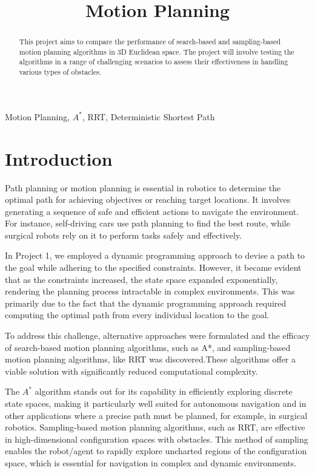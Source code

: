 \documentclass[journal]{IEEEtran} %
\begin{document}
\title{Motion Planning\\
}

\author{%
}

\maketitle

\begin{abstract}
    This project aims to compare the performance of search-based and sampling-based motion planning algorithms in 3D Euclidean space. The project will
     involve testing the algorithms in a range of challenging scenarios to assess their effectiveness in handling various types of obstacles.
    
\end{abstract}

\begin{IEEEkeywords}
   Motion Planning, $A^{\ast}$, RRT, Deterministic Shortest Path
\end{IEEEkeywords}
\section{Introduction}
Path planning or motion planning is essential in robotics to determine the optimal path for achieving objectives or reaching target locations. 
It involves generating a sequence of safe and efficient actions to navigate the environment. For instance, self-driving cars use 
path planning to find the best route, while surgical robots rely on it to perform tasks safely and effectively. 

In Project 1, we employed a dynamic programming approach to devise a path to the goal while adhering to the specified constraints. 
However, it became evident that as the constraints increased, the state space expanded exponentially, rendering the planning process intractable 
in complex environments. This was primarily due to the fact that the dynamic programming approach required computing the optimal path from every 
individual location to the goal.

To address this challenge, alternative approaches were formulated and the efficacy of search-based motion planning algorithms, 
such as A*, and sampling-based motion planning algorithms, like RRT was discovered.These algorithms offer a viable solution with significantly reduced computational complexity. 

The $A^\ast$ algorithm stands out for its capability in efficiently exploring discrete state spaces, making it particularly well suited for autonomous navigation and in other
applications where a precise path must be planned, for example, in surgical robotics. 
Sampling-based motion planning algorithms, such as RRT, are effective in high-dimensional configuration spaces with obstacles. 
This method of sampling enables the robot/agent to rapidly explore uncharted regions of the configuration space, which is essential
for navigation in complex and dynamic environments. 
 
\end{document}
